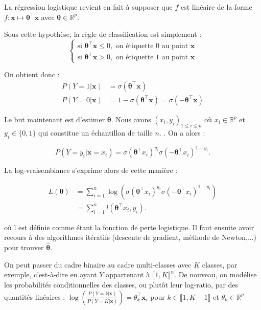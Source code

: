 \documentclass{article}
\begin{document}
La régression logistique revient en fait à supposer que \( f \) est linéaire de la forme \( f : \bm{x} \mapsto \bm{\theta}^\top \bm{x} \) avec \( \bm{\theta} \in \mathbb{R}^p \).


Sous cette hypothèse, la règle de classification est simplement :
\[
\begin{cases}
\text{si } \bm{\theta}^\top \bm{x}\leq 0 , \text{ on étiquette 0 au point } \bm{x} \\
\text{si } \bm{\theta}^\top \bm{x} > 0, \text{ on étiquette 1 au point } \bm{x}
\end{cases}
\]

On obtient donc :
\begin{align*}
    P(Y=1|\bm{x}) &= \sigma(\bm{\theta}^\top \bm{x}) \\
    P(Y=0|\bm{x}) &= 1- \sigma(\bm{\theta}^\top \bm{x}) = \sigma(-\bm{\theta}^\top \bm{x})
\end{align*}

Le but maintenant est d'estimer $\bm{\theta}$. Nous avons $(x_i, y_i)_{1 \leq i \leq n}$  où \(x_i \in \mathbb{R}^p\) et \(y_i \in \{0,1\}\) qui constitue un échantillon de taille \(n\).
. On a alors :

\[ P(Y = y_i | \bm{x} = x_i) = \sigma(\bm{\theta}^\top x_i)^{y_i} \sigma(-\bm{\theta}^\top x_i)^{1-y_i}. \]

La log-vraisemblance s'exprime alors de cette manière :

\begin{align*}
    L(\bm{\theta}) &= \sum_{i=1}^{n} \log\left( \sigma(\bm{\theta}^\top x_i)^{y_i} \sigma(-\bm{\theta}^\top x_i)^{1-y_i} \right) \\
                   &= \sum_{i=1}^{n} l(\bm{\theta}^\top x_i, y_i).
\end{align*}

où l est définie comme étant la fonction de perte logistique. Il faut ensuite  avoir recours à des algorithmes itératifs (descente de gradient, méthode de Newton,...) pour trouver  $\bm{\hat{\theta}}$.

On peut passer du cadre binaire au cadre multi-classes avec \(K\) classes, par exemple, c'est-à-dire en ayant \(Y\) appartenant à \(\llbracket 1, K \rrbracket^{n}\). De nouveau, on modélise les probabilités conditionnelles des classes, ou plutôt leur log-ratio, par des quantités linéaires :
$\log\left(\frac{P(Y=k|\bm{x})}{P(Y=K|\bm{x})}\right) = \theta_k^\top \bm{x}_i
$ pour \(k \in \llbracket 1, K-1 \rrbracket\) et $\theta_{k} \in \mathbb{R}^p$
\end{document}
